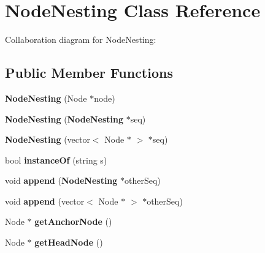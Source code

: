 \section{NodeNesting Class Reference}
\label{classbr_1_1pucrio_1_1telemidia_1_1ginga_1_1ncl_1_1model_1_1components_1_1NodeNesting}
Collaboration diagram for NodeNesting:\subsection*{Public Member Functions}
\begin{CompactItemize}
\item 
\textbf{NodeNesting} (Node $\ast$node)\label{classbr_1_1pucrio_1_1telemidia_1_1ginga_1_1ncl_1_1model_1_1components_1_1NodeNesting_5e793c619a4e8248d0fd0882cc2ba328}

\item 
\textbf{NodeNesting} ({\bf NodeNesting} $\ast$seq)\label{classbr_1_1pucrio_1_1telemidia_1_1ginga_1_1ncl_1_1model_1_1components_1_1NodeNesting_1db0406244f60f4878a2182bd411f148}

\item 
\textbf{NodeNesting} (vector$<$ Node $\ast$ $>$ $\ast$seq)\label{classbr_1_1pucrio_1_1telemidia_1_1ginga_1_1ncl_1_1model_1_1components_1_1NodeNesting_fe394c964a9d47e9d458f1d72fc34679}

\item 
bool \textbf{instanceOf} (string s)\label{classbr_1_1pucrio_1_1telemidia_1_1ginga_1_1ncl_1_1model_1_1components_1_1NodeNesting_4081cb1ebb5adebc1d0858ff6f69af0d}

\item 
void \textbf{append} ({\bf NodeNesting} $\ast$otherSeq)\label{classbr_1_1pucrio_1_1telemidia_1_1ginga_1_1ncl_1_1model_1_1components_1_1NodeNesting_9921c8056a886311013ab70dbd785e09}

\item 
void \textbf{append} (vector$<$ Node $\ast$ $>$ $\ast$otherSeq)\label{classbr_1_1pucrio_1_1telemidia_1_1ginga_1_1ncl_1_1model_1_1components_1_1NodeNesting_db3ef699e9e12c61288a8249d406d654}

\item 
Node $\ast$ \textbf{getAnchorNode} ()\label{classbr_1_1pucrio_1_1telemidia_1_1ginga_1_1ncl_1_1model_1_1components_1_1NodeNesting_5d9a8aa4e9815318b8825b1847638bd2}

\item 
Node $\ast$ \textbf{getHeadNode} ()\label{classbr_1_1pucrio_1_1telemidia_1_1ginga_1_1ncl_1_1model_1_1components_1_1NodeNesting_cc5b64d6ae021f0333b48803fd86b622}


\end{CompactItemize}
